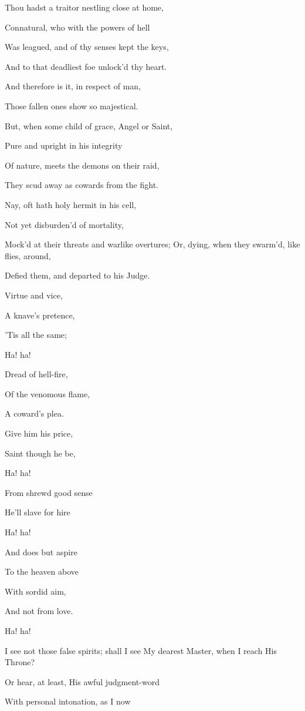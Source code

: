 Thou hadst a traitor nestling close at home,

Connatural, who with the powers of hell

Was leagued, and of thy senses kept the keys,

And to that deadliest foe unlock'd thy heart.

And therefore is it, in respect of man,

Those fallen ones show so majestical.

But, when some child of grace, Angel or Saint,

Pure and upright in his integrity

Of nature, meets the demons on their raid,

They scud away as cowards from the fight.

Nay, oft hath holy hermit in his cell,

Not yet disburden'd of mortality,

Mock'd at their threats and warlike overtures; Or, dying, when they swarm'd, like flies, around,

Defied them, and departed to his Judge.


Virtue and vice,

A knave's pretence,

'Tis all the same;

Ha! ha!

Dread of hell-fire,

Of the venomous flame,

A coward's plea.

Give him his price,

Saint though he be,

Ha! ha!

From shrewd good sense

He'll slave for hire

Ha! ha!

And does but aspire

To the heaven above

With sordid aim,

And not from love.

Ha! ha!


I see not those false spirits; shall I see My dearest Master, when I reach His Throne?

Or hear, at least, His awful judgment-word

With personal intonation, as I now

